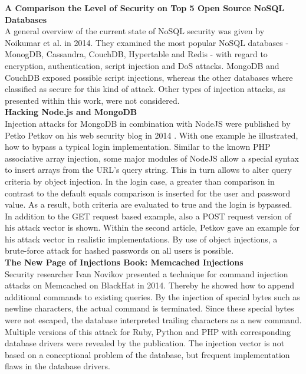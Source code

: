 \textbf{A Comparison the Level of Security on Top 5 Open Source NoSQL Databases} \cite{Noiumkar:2014} \\
A general overview of the current state of NoSQL security was given by Noikumar et al. in 2014. They examined the most popular NoSQL databases - MonogDB, Cassandra, CouchDB, Hypertable and Redis - with regard to encryption, authentication, script injection and DoS attacks. MongoDB and CouchDB exposed possible script injections, whereas the other databases where classified as secure for this kind of attack. Other types of injection attacks, as presented within this work, were not considered. \\

\textbf{Hacking Node.js and MongoDB}\cite{Petkov:2014a, Petkov:2014b} \\
Injection attacks for MongoDB in combination with NodeJS were published by Petko Petkov on his web security blog in 2014 \cite{Petkov:2014a, Petkov:2014b}. With one example he illustrated, how to bypass a typical login implementation. Similar to the known PHP associative array injection, some major modules of NodeJS allow a special syntax to insert arrays from the URL's query string. This in turn allows to alter query criteria by object injection. In the login case, a greater than comparison in contrast to the default equals comparison is inserted for the user and password value. As a result, both criteria are evaluated to true and the login is bypassed. In addition to the GET request based example, also a POST request version of his attack vector is shown. Within the second article, Petkov gave an example for his attack vector in realistic implementations. By use of object injections, a brute-force attack for hashed passwords on all users is possible.\\

\textbf{The New Page of Injections Book: Memcached Injections} \cite{Novikov:2014} \\
Security researcher Ivan Novikov presented a technique for command injection attacks on Memcached on BlackHat in 2014. Thereby he showed how to append additional commands to existing queries. By the injection of special bytes such as newline characters, the actual command is terminated. Since these special bytes were not escaped, the database interpreted trailing characters as a new command. Multiple versions of this attack for Ruby, Python and PHP with corresponding database drivers were revealed by the publication. The injection vector is not based on a conceptional problem of the database, but frequent implementation flaws in the database drivers. \\

